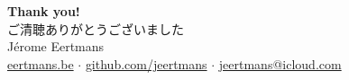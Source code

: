 \documentclass[aspectratio=169,t]{beamer}
\begin{document}
\begin{frame}[c]{}
  \vfill
  \begin{center}
    {\Huge\bfseries Thank you!}\\[12pt]
    {\Large ご清聴ありがとうございました}\\[18pt]
    {\large Jérome Eertmans}\\[6pt]
    {\small
      \href{https://eertmans.be}{eertmans.be}
      \quad$\cdot$\quad
      \href{https://github.com/jeertmans}{github.com/jeertmans}
      \quad$\cdot$\quad
      \href{mailto:jeertmans@icloud.com}{jeertmans@icloud.com}
    }
  \end{center}
  \vfill
\end{frame}
\end{document}
